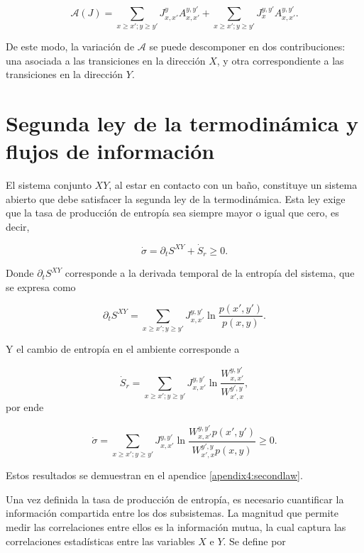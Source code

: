 \begin{equation}
    \mathcal{A}(J) = \sum_{x\geq x';y \geq y'} J_{x,x'}^{y}A_{x,x'}^{y,y'} + \sum_{x \geq x'; y \geq y'}J_{x}^{y,y'} A_{x,x'}^{y,y'}.
\label{sec4:functionalcurrent}
\end{equation}

De este modo, la variación de \( \mathcal{A} \) se puede descomponer en dos contribuciones: una asociada a las transiciones en la dirección \( X \), y otra correspondiente a las transiciones en la dirección \( Y \).


\label{sec4:flujos}
\section{Segunda ley de la termodinámica y flujos de información}
El sistema conjunto \( XY \), al estar en contacto con un baño, constituye un sistema abierto que debe satisfacer la segunda ley de la termodinámica. Esta ley exige que la tasa de producción de entropía sea siempre mayor o igual que cero, es decir, 

\begin{equation*}
    \dot{\sigma} = \partial_{t}S^{XY} + \dot{S}_{r} \geq 0. 
\end{equation*}

Donde $\partial_{t}S^{XY}$ corresponde a la derivada temporal de la entropía del sistema, que se expresa como  

\begin{equation*}
    \partial_{t}S^{XY} = \sum_{x\geq x'; y\geq y'} J_{x,x'}^{y,y'} \ln \frac{p(x',y')}{p(x,y)}.
\end{equation*}

Y el cambio de entropía en el ambiente corresponde a

\begin{equation*}
    \dot{S}_{r} = \sum_{x\geq x'; y\geq y'} J_{x,x'}^{y,y'} \ln \frac{W_{x,x'}^{y,y'}}{W_{x',x}^{y',y}},
\end{equation*}
por ende

\begin{equation*}
    \dot{\sigma} = \sum_{x\geq x'; y\geq y'} J_{x,x'}^{y,y'} \ln \frac{ W_{x,x'}^{y,y'}p(x',y')  }{ W_{x',x}^{y',y}p(x,y) } \geq 0.
\end{equation*}

Estos resultados se demuestran en el apendice \ref{apendix4:secondlaw}.  

Una vez definida la tasa de producción de entropía, es necesario cuantificar la información compartida entre los dos subsistemas. La magnitud que permite medir las correlaciones entre ellos es la información mutua, la cual captura las correlaciones estadísticas entre las variables \( X \) e \( Y \). Se define por


